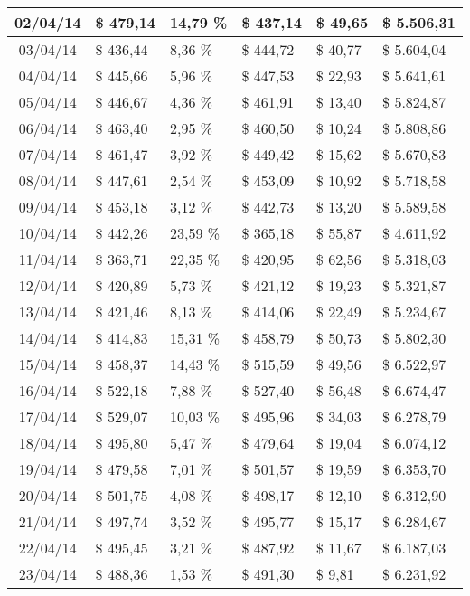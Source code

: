\begin{small}
\begin{longtable}{|c|l|l|l|l|l|}
02/04/14 & \$ 479,14 & 14,79 \% & \$ 437,14 & \$ 49,65 & \$ 5.506,31 \\ \hline
03/04/14 & \$ 436,44 & 8,36 \% & \$ 444,72 & \$ 40,77 & \$ 5.604,04 \\ \hline
04/04/14 & \$ 445,66 & 5,96 \% & \$ 447,53 & \$ 22,93 & \$ 5.641,61 \\ \hline
05/04/14 & \$ 446,67 & 4,36 \% & \$ 461,91 & \$ 13,40 & \$ 5.824,87 \\ \hline
06/04/14 & \$ 463,40 & 2,95 \% & \$ 460,50 & \$ 10,24 & \$ 5.808,86 \\ \hline
07/04/14 & \$ 461,47 & 3,92 \% & \$ 449,42 & \$ 15,62 & \$ 5.670,83 \\ \hline
08/04/14 & \$ 447,61 & 2,54 \% & \$ 453,09 & \$ 10,92 & \$ 5.718,58 \\ \hline
09/04/14 & \$ 453,18 & 3,12 \% & \$ 442,73 & \$ 13,20 & \$ 5.589,58 \\ \hline
10/04/14 & \$ 442,26 & 23,59 \% & \$ 365,18 & \$ 55,87 & \$ 4.611,92 \\ \hline
11/04/14 & \$ 363,71 & 22,35 \% & \$ 420,95 & \$ 62,56 & \$ 5.318,03 \\ \hline
12/04/14 & \$ 420,89 & 5,73 \% & \$ 421,12 & \$ 19,23 & \$ 5.321,87 \\ \hline
13/04/14 & \$ 421,46 & 8,13 \% & \$ 414,06 & \$ 22,49 & \$ 5.234,67 \\ \hline
14/04/14 & \$ 414,83 & 15,31 \% & \$ 458,79 & \$ 50,73 & \$ 5.802,30 \\ \hline
15/04/14 & \$ 458,37 & 14,43 \% & \$ 515,59 & \$ 49,56 & \$ 6.522,97 \\ \hline
16/04/14 & \$ 522,18 & 7,88 \% & \$ 527,40 & \$ 56,48 & \$ 6.674,47 \\ \hline
17/04/14 & \$ 529,07 & 10,03 \% & \$ 495,96 & \$ 34,03 & \$ 6.278,79 \\ \hline
18/04/14 & \$ 495,80 & 5,47 \% & \$ 479,64 & \$ 19,04 & \$ 6.074,12 \\ \hline
19/04/14 & \$ 479,58 & 7,01 \% & \$ 501,57 & \$ 19,59 & \$ 6.353,70 \\ \hline
20/04/14 & \$ 501,75 & 4,08 \% & \$ 498,17 & \$ 12,10 & \$ 6.312,90 \\ \hline
21/04/14 & \$ 497,74 & 3,52 \% & \$ 495,77 & \$ 15,17 & \$ 6.284,67 \\ \hline
22/04/14 & \$ 495,45 & 3,21 \% & \$ 487,92 & \$ 11,67 & \$ 6.187,03 \\ \hline
23/04/14 & \$ 488,36 & 1,53 \% & \$ 491,30 & \$ 9,81 & \$ 6.231,92 \\ \hline

\end{longtable}
\end{small}

